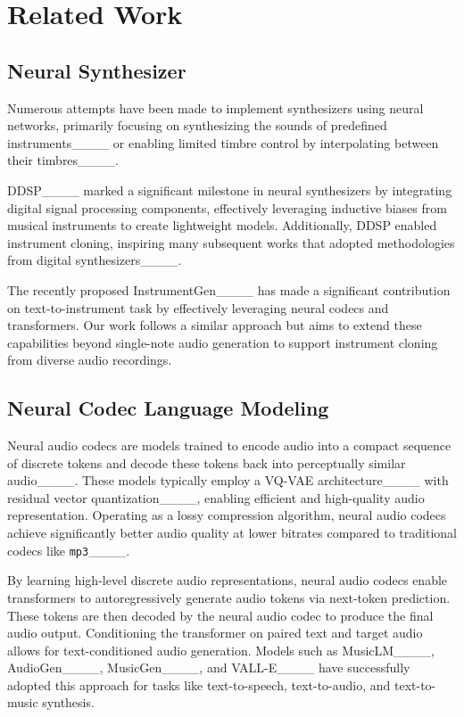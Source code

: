 \section{Related Work}
\label{sec:related_work}

\subsection{Neural Synthesizer}
Numerous attempts have been made to implement synthesizers using neural networks, primarily focusing on synthesizing the sounds of predefined instruments____ or enabling limited timbre control by interpolating between their timbres____.

DDSP____ marked a significant milestone in neural synthesizers by integrating digital signal processing components, effectively leveraging inductive biases from musical instruments to create lightweight models. Additionally, DDSP enabled instrument cloning, inspiring many subsequent works that adopted methodologies from digital synthesizers____.

The recently proposed InstrumentGen____ has made a significant contribution on text-to-instrument task by effectively leveraging neural codecs and transformers.
Our work follows a similar approach but aims to extend these capabilities beyond single-note audio generation to support instrument cloning from diverse audio recordings. 

\subsection{Neural Codec Language Modeling}

Neural audio codecs are models trained to encode audio into a compact sequence of discrete tokens and decode these tokens back into perceptually similar audio____. These models typically employ a VQ-VAE architecture____ with residual vector quantization____, enabling efficient and high-quality audio representation. Operating as a lossy compression algorithm, neural audio codecs achieve significantly better audio quality at lower bitrates compared to traditional codecs like \texttt{mp3}____.

By learning high-level discrete audio representations, neural audio codecs enable transformers to autoregressively generate audio tokens via next-token prediction. These tokens are then decoded by the neural audio codec to produce the final audio output. Conditioning the transformer on paired text and target audio allows for text-conditioned audio generation. Models such as MusicLM____, AudioGen____, MusicGen____, and VALL-E____ have successfully adopted this approach for tasks like text-to-speech, text-to-audio, and text-to-music synthesis.